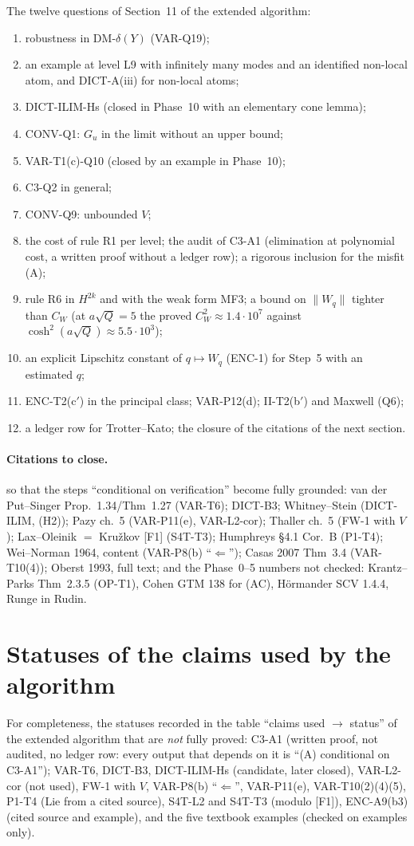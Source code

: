 The twelve questions of Section~11 of the extended algorithm:
\begin{enumerate}
\item robustness in DM-$\delta(Y)$ (VAR-Q19);
\item an example at level L9 with infinitely many modes and an identified non-local atom, and DICT-A(iii) for non-local atoms;
\item DICT-ILIM-Hs (closed in Phase~10 with an elementary cone lemma);
\item CONV-Q1: $G_u$ in the limit without an upper bound;
\item VAR-T1(c)-Q10 (closed by an example in Phase~10);
\item C3-Q2 in general;
\item CONV-Q9: unbounded $V$;
\item the cost of rule R1 per level; the audit of C3-A1 (elimination at polynomial cost, a written proof without a ledger row); a rigorous inclusion for the misfit (A);
\item rule R6 in $H^{2k}$ and with the weak form MF3; a bound on $\|W_q\|$ tighter than $C_W$ (at $a\sqrt Q=5$ the proved $C_W^2\approx1.4\cdot10^7$ against $\cosh^2(a\sqrt Q)\approx5.5\cdot10^3$);
\item an explicit Lipschitz constant of $q\mapsto W_q$ (ENC-1) for Step~5 with an estimated $q$;
\item ENC-T2(c$'$) in the principal class; VAR-P12(d); II-T2(b$'$) and Maxwell (Q6);
\item a ledger row for Trotter--Kato; the closure of the citations of the next section.
\end{enumerate}

\paragraph{Citations to close.} so that the steps ``conditional on verification'' become fully grounded: van der Put--Singer Prop.~1.34/Thm~1.27 (VAR-T6); DICT-B3; Whitney--Stein (DICT-ILIM, (H2)); Pazy ch.~5 (VAR-P11(e), VAR-L2-cor); Thaller ch.~5 (FW-1 with $V$); Lax--Oleinik $=$ Kru\v zkov [F1] (S4T-T3); Humphreys \S4.1 Cor.~B (P1-T4); Wei--Norman 1964, content (VAR-P8(b) ``$\Leftarrow$''); Casas 2007 Thm~3.4 (VAR-T10(4)); Oberst 1993, full text; and the Phase~0--5 numbers not checked: Krantz--Parks Thm~2.3.5 (OP-T1), Cohen GTM 138 for (AC), H\"ormander SCV 1.4.4, Runge in Rudin.

\section{Statuses of the claims used by the algorithm}

For completeness, the statuses recorded in the table ``claims used $\to$ status'' of the extended algorithm that are \emph{not} fully proved: C3-A1 (written proof, not audited, no ledger row: every output that depends on it is ``(A) conditional on C3-A1''); VAR-T6, DICT-B3, DICT-ILIM-Hs (candidate, later closed), VAR-L2-cor (not used), FW-1 with $V$, VAR-P8(b) ``$\Leftarrow$'', VAR-P11(e), VAR-T10(2)(4)(5), P1-T4 (Lie from a cited source), S4T-L2 and S4T-T3 (modulo [F1]), ENC-A9(b3) (cited source and example), and the five textbook examples (checked on examples only).
